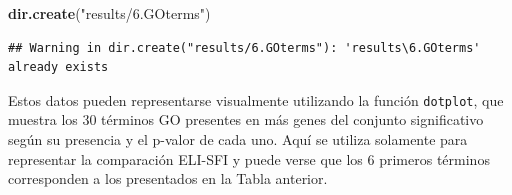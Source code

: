 \documentclass[
]{article}
\newenvironment{Shaded}{\begin{snugshade}}{\end{snugshade}}
\newcommand{\DataTypeTok}[1]{\textcolor[rgb]{0.13,0.29,0.53}{#1}}
\newcommand{\DecValTok}[1]{\textcolor[rgb]{0.00,0.00,0.81}{#1}}
\newcommand{\KeywordTok}[1]{\textcolor[rgb]{0.13,0.29,0.53}{\textbf{#1}}}
\newcommand{\NormalTok}[1]{#1}
\newcommand{\OperatorTok}[1]{\textcolor[rgb]{0.81,0.36,0.00}{\textbf{#1}}}
\newcommand{\StringTok}[1]{\textcolor[rgb]{0.31,0.60,0.02}{#1}}
\begin{document}
\begin{Shaded}
\begin{Highlighting}[]
\KeywordTok{dir.create}\NormalTok{(}\StringTok{"results/6.GOterms"}\NormalTok{)}
\end{Highlighting}
\end{Shaded}

\begin{verbatim}
## Warning in dir.create("results/6.GOterms"): 'results\6.GOterms' already exists
\end{verbatim}

\begin{Shaded}
\end{Shaded}

Estos datos pueden representarse visualmente utilizando la función
\texttt{dotplot}, que muestra los 30 términos GO presentes en más genes
del conjunto significativo según su presencia y el p-valor de cada uno.
Aquí se utiliza solamente para representar la comparación ELI-SFI y
puede verse que los 6 primeros términos corresponden a los presentados
en la Tabla anterior.
\end{document}
